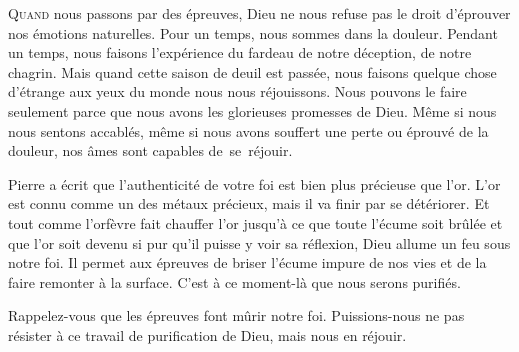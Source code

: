 
\lettrine{Q}{uand} nous passons par des épreuves, Dieu ne nous refuse pas
 le droit d'éprouver nos émotions naturelles. Pour un temps, nous sommes
 dans la douleur. Pendant un temps, nous faisons l'expérience du fardeau
 de notre déception, de notre chagrin. Mais quand cette saison de deuil
 est passée, nous faisons quelque chose d'étrange aux yeux du monde\frcolon{}
 nous nous réjouissons.
 Nous pouvons le faire seulement parce que nous avons les glorieuses
 promesses de Dieu. Même si nous nous sentons accablés,
 même si nous avons souffert une perte ou éprouvé de la douleur,
 nos âmes sont capables de~se~réjouir.


Pierre a écrit que l'authenticité de votre foi est bien plus précieuse que l'or.
 L'or est connu comme un des métaux précieux, mais il va finir par se détériorer.
 Et tout comme l'orfèvre fait chauffer l'or jusqu'à ce que toute l'écume
 soit brûlée et que l'or soit devenu si pur qu'il puisse y voir sa réflexion,
 Dieu allume un feu sous notre foi. Il permet aux épreuves de briser l'écume
 impure de nos vies et de la faire remonter à la surface.
 C'est à ce moment-là que nous serons purifiés.

Rappelez-vous que les épreuves font mûrir notre foi.
 Puissions-nous ne pas résister à ce travail de purification de Dieu,
 mais nous en réjouir.

\dvrule






